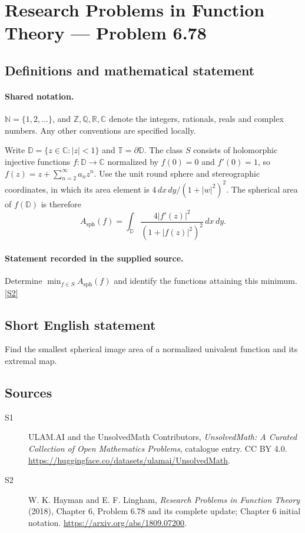 \documentclass[11pt]{article}
\newcommand{\sref}[2]{\hyperlink{source:#1:#2}{[S#2]}}
\begin{document}
\section{Research Problems in Function Theory — Problem 6.78}\label{statement}

\subsection{Definitions and mathematical statement}

\paragraph{Shared notation.}$\mathbb N=\{1,2,\ldots\}$, and $\mathbb Z,\mathbb Q,\mathbb R,\mathbb C$ denote the integers, rationals, reals and complex numbers. Any other conventions are specified locally.


Write $\mathbb D=\{z\in\mathbb C:|z|<1\}$ and $\mathbb T=\partial\mathbb D$. The class $S$ consists of holomorphic injective functions $f:\mathbb D\to\mathbb C$ normalized by $f(0)=0$ and $f'(0)=1$, so $f(z)=z+\sum_{n=2}^{\infty}a_nz^n$. Use the unit round sphere and stereographic coordinates, in which its area element is $4\,dx\,dy/(1+|w|^2)^2$. The spherical area of $f(\mathbb D)$ is therefore \[A_{\mathrm{sph}}(f)=\int_{\mathbb D}\frac{4|f'(z)|^2}{(1+|f(z)|^2)^2}\,dx\,dy.\]
\paragraph{Statement recorded in the supplied source.}
Determine $\min_{f\in S}A_{\mathrm{sph}}(f)$ and identify the functions attaining this minimum. \sref{statement}{2}
\subsection{Short English statement}
Find the smallest spherical image area of a normalized univalent function and its extremal map.
\subsection{Sources}
\begin{description}
\item[\hypertarget{source:statement:1}{S1}] ULAM.AI and the UnsolvedMath Contributors, \emph{UnsolvedMath: A Curated Collection of Open Mathematics Problems}, catalogue entry. CC BY 4.0. \url{https://huggingface.co/datasets/ulamai/UnsolvedMath}.
\item[\hypertarget{source:statement:2}{S2}] W. K. Hayman and E. F. Lingham, \emph{Research Problems in Function Theory} (2018), Chapter 6, Problem 6.78 and its complete update; Chapter 6 initial notation. \url{https://arxiv.org/abs/1809.07200}.
\end{description}
\label{end:statement}
\end{document}
